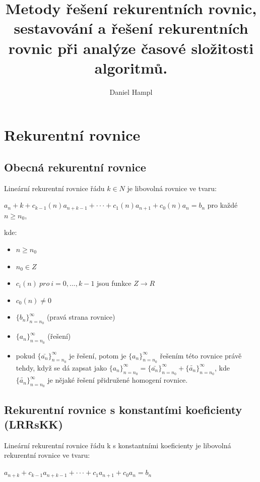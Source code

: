 \documentclass{szzclass}
\title{Metody řešení rekurentních rovnic, sestavování a   řešení rekurentních rovnic při analýze časové složitosti algoritmů.}
\author{Daniel Hampl}
\begin{document}
\maketitle


\section{Rekurentní rovnice}

\subsection{Obecná rekurentní rovnice}

Lineární rekurentní rovnice řádu $k \in N$ je libovolná rovnice ve tvaru:

\begin{center}
$a_n+k + c_{k-1}(n) a_{n+k-1} + · · · + c_1(n) a_{n+1} + c_0(n) a_n = b_n$ pro každé $n \geq n_0$,
\end{center}


kde:
\begin{itemize}
    \item $n \geq n_0$
    \item $n_0 \in Z$
    \item $c_i(n)\ pro\ i = 0, . . . , k-1$ jsou funkce $Z \rightarrow R$
    \item $c_0(n) \neq 0$
    \item $\{b_n\}^\infty_{n = n_0}$ (pravá strana rovnice)
    \item $\{a_n\}^\infty_{n=n_0}$ (řešení)
    \item pokud $\{\bar{a_n}\}^\infty_{n=n_0}$ je řešení, potom je $\{a_n\}^\infty_{n=n_0}$
    řešením této rovnice právě tehdy, když se dá zapsat jako
    $\{a_n\}^\infty_{n=n_0} = \{\bar{a_n}\}^\infty_{n=n_0} + \{\tilde{a_n}\}^\infty_{n=n_0}$,
    kde $\{\tilde{a_n}\}^\infty_{n=n_0}$ je nějaké řešení přidružené homogení rovnice.
\end{itemize}

\subsection{Rekurentní rovnice s konstantími koeficienty (LRRsKK)}

Lineární rekurentní rovnice řádu k s konstantními koeficienty je
libovolná rekurentní rovnice ve tvaru:

\begin{center}
$a_{n+k} + c_{k−1}a_{n+k−1} + · · · + c_1a_{n+1} + c_0a_n = b_n$ 
\end{center}
\end{document}

